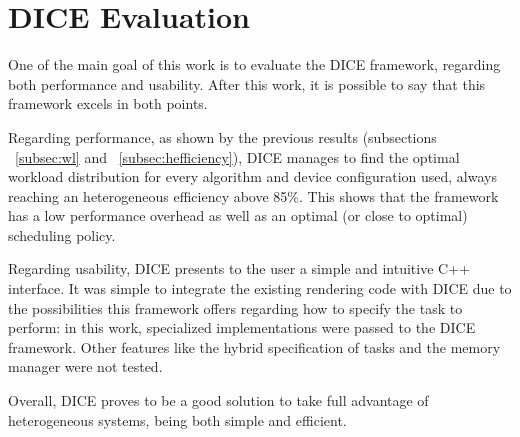 
\section{DICE Evaluation}

One of the main goal of this work is to evaluate the DICE framework, regarding both performance and usability. After this work, it is possible to say that this framework excels in both points.

Regarding performance, as shown by the previous results (subsections ~\ref{subsec:wl} and ~\ref{subsec:hefficiency}), DICE manages to find the optimal workload distribution for every algorithm and device configuration used, always reaching an heterogeneous efficiency above 85\%. This shows that the framework has a low performance overhead as well as an optimal (or close to optimal) scheduling policy.

Regarding usability, DICE presents to the user a simple and intuitive C++ interface. It was simple to integrate the existing rendering code with DICE due to the possibilities this framework offers regarding how to specify the task to perform: in this work, specialized implementations were passed to the DICE framework. %
Other features like the hybrid specification of tasks and the memory manager were not tested.

Overall, DICE proves to be a good solution to take full advantage of heterogeneous systems, being both simple and efficient.